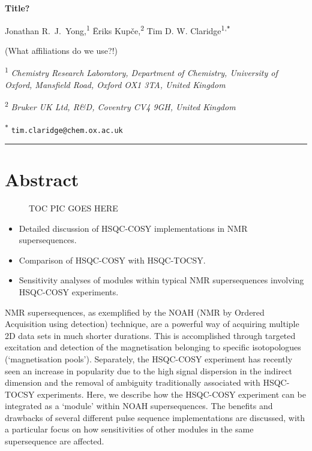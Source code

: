 \documentclass[a4paper,12pt]{article}
\newcommand{\me}{Jonathan R.\ J.\ Yong}
\newcommand{\eriks}{{\=E}riks Kup{\v{c}}e}
\newcommand{\tim}{Tim D. W. Claridge}
\newcommand{\articletitle}{\todo{Title?}}
\newcommand{\crl}{Chemistry Research Laboratory, Department of Chemistry, University of Oxford, Mansfield Road, Oxford OX1 3TA, United Kingdom}
\newcommand{\turing}{The Alan Turing Institute, The British Library, 96 Euston Road, London NW1 2DB, United Kingdom}
\newcommand{\brukeruk}{Bruker UK Ltd, R\&D, Coventry CV4 9GH, United Kingdom}
\newcommand{\exscientia}{Exscientia Ltd, The Schr{\"o}dinger Building, Oxford Science Park, Oxford OX4 4GE, United Kingdom}
\newcommand{\proton}{\ch{^{1}H}}
\newcommand{\todo}[1]{{\color{OrangeRed}#1}}
\begin{document}
 \begin{refsection}

\begin{center}   %
    \textbf{\Large \articletitle{}}

    \vspace{0.2cm}

    \me{},\textsuperscript{1} \eriks{},\textsuperscript{2} \tim\textsuperscript{1,\texttt{*}}

    \vspace{0.2cm}

    \small

    \todo{(What affiliations do we use?!)}

    \textsuperscript{1} \textit{\crl{}}


    \textsuperscript{2} \textit{\brukeruk{}}


    \normalsize \textsuperscript{\texttt{*}} \texttt{tim.claridge@chem.ox.ac.uk}

    \vspace{0.5cm} \hrule

\end{center}

\section*{Abstract}
\begin{figure}[ht]
    \todo{TOC PIC GOES HERE}
\end{figure}

\begin{itemize}
    \item Detailed discussion of HSQC-COSY implementations in NMR supersequences.
    \item Comparison of HSQC-COSY with HSQC-TOCSY.
    \item Sensitivity analyses of modules within typical NMR supersequences involving HSQC-COSY experiments.
\end{itemize}

NMR supersequences, as exemplified by the NOAH (NMR by Ordered Acquisition using \proton detection) technique, are a powerful way of acquiring multiple 2D data sets in much shorter durations.
This is accomplished through targeted excitation and detection of the magnetisation belonging to specific isotopologues (`magnetisation pools').
Separately, the HSQC-COSY experiment has recently seen an increase in popularity due to the high signal dispersion in the indirect dimension and the removal of ambiguity traditionally associated with HSQC-TOCSY experiments.
Here, we describe how the HSQC-COSY experiment can be integrated as a `module' within NOAH supersequences.
The benefits and drawbacks of several different pulse sequence implementations are discussed, with a particular focus on how sensitivities of other modules in the same supersequence are affected.


\end{refsection}
\end{document}
